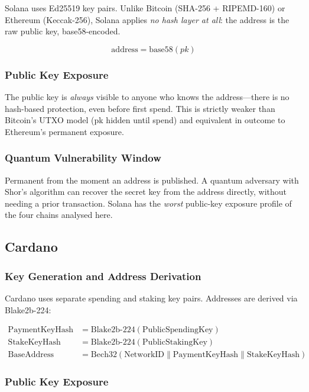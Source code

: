 Solana uses Ed25519 key pairs. Unlike Bitcoin (SHA-256 + RIPEMD-160)
or Ethereum (Keccak-256), Solana applies \emph{no hash layer at all}:
the address is the raw public key, base58-encoded.

\[
\text{address} = \text{base58}(pk)
\]

\subsubsection{Public Key Exposure}

The public key is \emph{always} visible to anyone who knows the
address---there is no hash-based protection, even before first spend.
This is strictly weaker than Bitcoin's UTXO model (pk hidden until
spend) and equivalent in outcome to Ethereum's permanent exposure.

\subsubsection{Quantum Vulnerability Window}

Permanent from the moment an address is published. A quantum adversary
with Shor's algorithm can recover the secret key from the address
directly, without needing a prior transaction. Solana has the
\emph{worst} public-key exposure profile of the four chains analysed
here.

\subsection{Cardano}

\subsubsection{Key Generation and Address Derivation}

Cardano uses separate spending and staking key pairs. Addresses are
derived via Blake2b-224:

\begin{align*}
\text{PaymentKeyHash} &= \text{Blake2b-224}(\text{PublicSpendingKey}) \\
\text{StakeKeyHash} &= \text{Blake2b-224}(\text{PublicStakingKey}) \\
\text{BaseAddress} &= \text{Bech32}(\text{NetworkID} \|
  \text{PaymentKeyHash} \| \text{StakeKeyHash})
\end{align*}

\subsubsection{Public Key Exposure}

